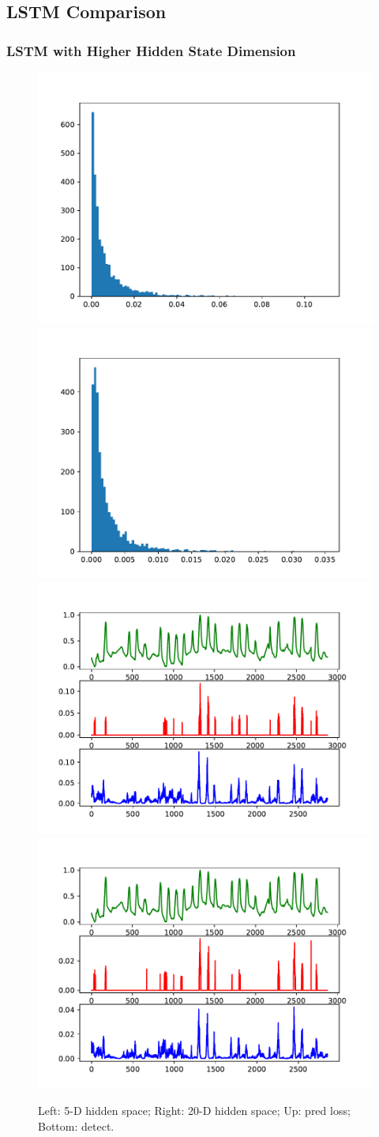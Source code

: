 \documentclass{beamer}
\begin{document}
\subsection{LSTM Comparison}
\begin{frame}
\frametitle{LSTM with Higher Hidden State Dimension}
\begin{figure}
\vspace{-0.1in}
\includegraphics[width=0.4\linewidth]{figs/lstm_dropout_test_h5_pred_loss_4layer.pdf}
\includegraphics[width=0.4\linewidth]{figs/lstm_dropout_test_h20_pred_loss_4layer.pdf}
\vspace{-0.2in}
\includegraphics[width=0.4\linewidth]{figs/lstm_dropout_test_h5_detect_4layer.pdf}
\includegraphics[width=0.4\linewidth]{figs/lstm_dropout_test_h20_detect_4layer.pdf}
\caption{Left: 5-D hidden space; Right: 20-D hidden space; Up: pred loss; Bottom: detect.}
\end{figure}
\end{frame}
\end{document}

